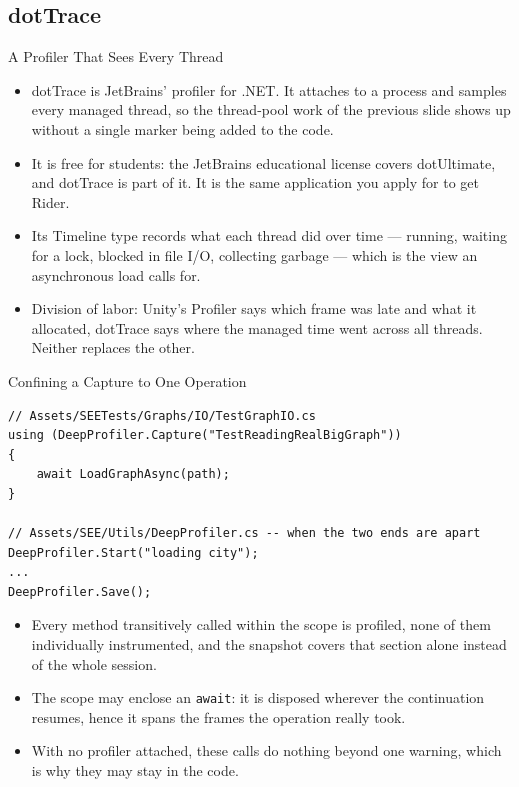\subsection{dotTrace}

\begin{frame}{A Profiler That Sees Every Thread}
  \begin{itemize}
    \item dotTrace is JetBrains' profiler for .NET. It attaches to a process and
      samples every managed thread, so the thread-pool work of the previous
      slide shows up without a single marker being added to the code.
    \item It is free for students: the JetBrains educational license covers
      dotUltimate, and dotTrace is part of it. It is the same application you
      apply for to get Rider.
    \item Its Timeline type records what each thread did over time --- running,
      waiting for a lock, blocked in file I/O, collecting garbage --- which is
      the view an asynchronous load calls for.
    \item Division of labor: Unity's Profiler says which frame was late and what
      it allocated, dotTrace says where the managed time went across all
      threads. Neither replaces the other.
  \end{itemize}
\end{frame}

\begin{frame}[fragile]{Confining a Capture to One Operation}
  \begin{lstlisting}[basicstyle=\scriptsize\ttfamily]
// Assets/SEETests/Graphs/IO/TestGraphIO.cs
using (DeepProfiler.Capture("TestReadingRealBigGraph"))
{
    await LoadGraphAsync(path);
}

// Assets/SEE/Utils/DeepProfiler.cs -- when the two ends are apart
DeepProfiler.Start("loading city");
...
DeepProfiler.Save();
  \end{lstlisting}
  \vspace{0.5ex}

  \begin{itemize}
    \item Every method transitively called within the scope is profiled, none of
      them individually instrumented, and the snapshot covers that section
      alone instead of the whole session.
    \item The scope may enclose an \texttt{await}: it is disposed wherever the
      continuation resumes, hence it spans the frames the operation really took.
    \item With no profiler attached, these calls do nothing beyond one warning,
      which is why they may stay in the code.
  \end{itemize}
\end{frame}

